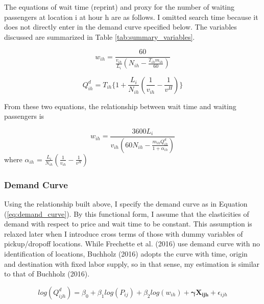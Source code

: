 The equations of wait time (reprint) and proxy for the number of waiting passengers at location i at hour h are as follows. I omitted search time because it does not directly enter in the demand curve specified below. The variables discussed are summarized in Table \ref{tab:summary_variables}.

\begin{equation}
w_{ih} = \frac{60}{\frac{v_{ih}}{L_i}(N_{ih}-\frac{T_{ih}m_{ih}}{60})}\label{eq:w}
\end{equation}

\begin{equation}
Q^d_{ih} = T_{ih}\{1+\frac{L_i}{N_{ih}}(\frac{1}{v_{ih}}-\frac{1}{v^H})\}\label{eq:Q^d}
\end{equation}

\noindent From these two equations, the relationship between wait time and waiting passengers is

\begin{equation}
w_{ih} = \frac{3600L_i}{v_{ih}(60N_{ih}-\frac{m_{ih}Q^d_{ih}}{1+\alpha_{ih}})}\label{eq:w_Q^d}
\end{equation}
where $\alpha_{ih}$ = $\frac{L_i}{N_{ih}}(\frac{1}{v_{ih}}-\frac{1}{v^H})$



\vspace{0.5cm}

\subsubsection{Demand Curve}

\hspace{0.5cm} Using the relationship built above, I specify the demand curve as in Equation (\ref{eq:demand_curve}). By this functional form, I assume that the elasticities of demand with respect to price and wait time to be constant. This assumption is relaxed later when I introduce cross terms of those with dummy variables of pickup/dropoff locations. While Frechette et al. (2016) use demand curve with no identification of locations,  Buchholz (2016) adopts the curve with time, origin and destination with fixed labor supply, so in that sense, my estimation is similar to that of Buchholz (2016). 


\begin{equation}
 log (Q^d_{ijh}) = \beta_0 + \beta_1 log (P_{ij}) + \beta_2 log (w_{ih}) + \mathbf{\bm{\gamma} X_{ijh}} + \epsilon_{ijh} \label{eq:demand_curve}
\end{equation}

